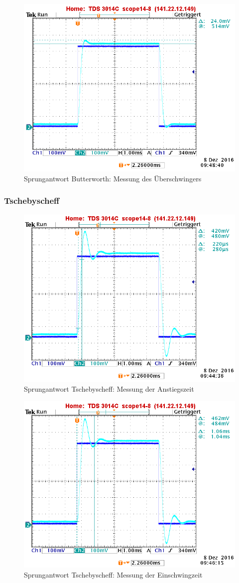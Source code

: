 \begin{figure}[h]
	\centering
	\includegraphics[width=0.60\linewidth]{Bilder/ImLabor/Sprungantwort_5_6_Butter_Ueberschwinger}
	\caption{Sprungantwort Butterworth: Messung des Überschwingers}
	\label{fig:Sprungantwort_5_6_Butter_Ueberschwinger}
\end{figure}

\newpage

\subsubsection{Tschebyscheff}

\begin{figure}[h]
	\centering
	\includegraphics[width=0.60\linewidth]{Bilder/ImLabor/Sprungantwort_5_3_Tscheby_Anstiegszeit}
	\caption{Sprungantwort Tschebyscheff: Messung der Anstiegszeit}
	\label{fig:Sprungantwort_5_3_Tscheby_Anstiegszeit_Anhang}
\end{figure}

\begin{figure}[h]
	\centering
	\includegraphics[width=0.60\linewidth]{Bilder/ImLabor/Sprungantwort_5_4_Tscheby_Einschwingzeit}
	\caption{Sprungantwort Tschebyscheff: Messung der Einschwingzeit}
	\label{fig:Sprungantwort_5_4_Tscheby_Einschwingzeit}
\end{figure}

